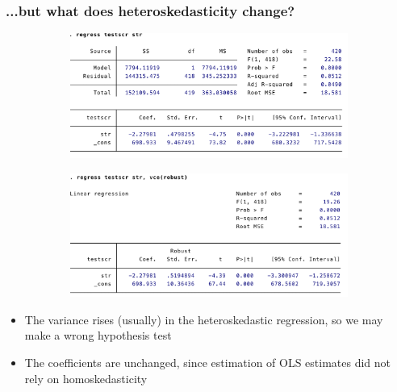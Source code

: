 \documentclass[aspectratio=169]{beamer}
\begin{document}
\begin{frame}
\frametitle{...but what does heteroskedasticity change?}
\begin{figure}[H]
\centering
\begin{subfigure}[b]{0.49\textwidth}
\includegraphics[width=\textwidth]{nonrobust.png}
\end{subfigure}
\begin{subfigure}[b]{0.49\textwidth}
\includegraphics[width=\textwidth]{robust.png}
\end{subfigure}
\end{figure}
\begin{itemize}
\item The variance rises (usually) in the heteroskedastic regression, so we may make a wrong hypothesis test
\item The coefficients are unchanged, since estimation of OLS estimates did not rely on homoskedasticity
\end{itemize}
\end{frame}
\end{document}
